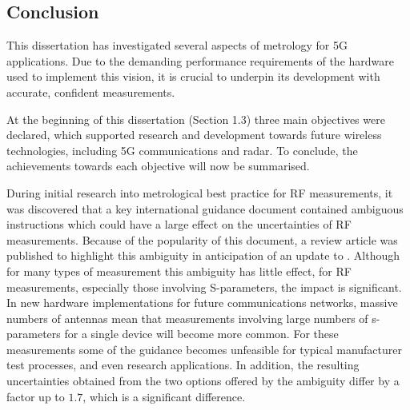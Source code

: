 \documentclass[../thesis/thesis.tex]{subfiles}
\begin{document}
\begin{refsection}
\chapter{Conclusion}

This dissertation has investigated several aspects of metrology for 5G applications. Due to the demanding performance requirements of the hardware used to implement this vision, it is crucial to underpin its development with accurate, confident measurements.

At the beginning of this dissertation (Section 1.3) three main objectives were declared, which supported research and development towards future wireless technologies, including 5G communications and radar. To conclude, the achievements towards each objective will now be summarised.

During initial research into metrological best practice for RF measurements, it was discovered that a key international guidance document \cite{GUM_2008} contained ambiguous instructions which could have a large effect on the uncertainties of RF measurements. Because of the popularity of this document, a review article was published \cite{Stant_2016} to highlight this ambiguity in anticipation of an update to \cite{GUM_2008}. Although for many types of measurement this ambiguity has little effect, for RF measurements, especially those involving S-parameters, the impact is significant. In new hardware implementations for future communications networks, massive numbers of antennas mean that measurements involving large numbers of s-parameters for a single device will become more common. For these measurements some of the guidance becomes unfeasible for typical manufacturer test processes, and even research applications. In addition, the resulting uncertainties obtained from the two options offered by the ambiguity differ by a factor up to $1.7$, which is a significant difference.


\end{refsection}
\end{document}
